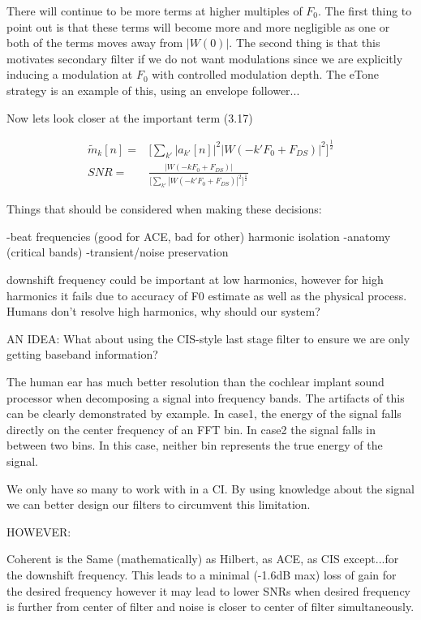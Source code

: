 \documentclass [11pt, proquest] {uwthesis}[2015/03/03]
\begin{document}
There will continue to be more terms at higher multiples of $F_0$.  The first thing to point out is that these terms will become more and more negligible as one or both of the terms moves away from $|W(0)|$.  The second thing is that this motivates secondary filter if we do not want modulations since we are explicitly inducing a modulation at $F_0$ with controlled modulation depth.  The eTone strategy is an example of this, using an envelope follower...

Now lets look closer at the important term (3.17)

\begin{align}
\tilde{m}_k[n] =& \Bigg[ \sum_{k'} | a_{k'}[n]|^2 |W(-k'F_0 + F_{DS})|^2 \Bigg]^\frac{1}{2} \\
SNR =& \frac{|W(-kF_0 + F_{DS})|}{\Big[ \sum_{k'} |W(-k'F_0 + F_{DS})|^2 \Big]^\frac{1}{2}}
\end{align}







Things that should be considered when making these decisions:

-beat frequencies (good for ACE, bad for other)
	harmonic isolation
-anatomy (critical bands)
-transient/noise preservation

downshift frequency could be important at low harmonics, however for high harmonics it fails due to accuracy of F0 estimate as well as the physical process.  Humans don't resolve high harmonics, why should our system?


AN IDEA:
What about using the CIS-style last stage filter to ensure we are only getting baseband information?




The human ear has much better resolution than the cochlear implant sound processor when decomposing a signal into frequency bands.  The artifacts of this can be clearly demonstrated by example.  In case1, the energy of the signal falls directly on the center frequency of an FFT bin.  In case2 the signal falls in between two bins.  In this case, neither bin represents the true energy of the signal.

We only have so many to work with in a CI.  By using knowledge about the signal we can better design our filters to circumvent this limitation.

HOWEVER:

Coherent is the Same (mathematically) as Hilbert, as ACE, as CIS except...for the downshift frequency.  This leads to a minimal (-1.6dB max) loss of gain for the desired frequency however it may lead to lower SNRs when desired frequency is further from center of filter and noise is closer to center of filter simultaneously.
\end{document}
